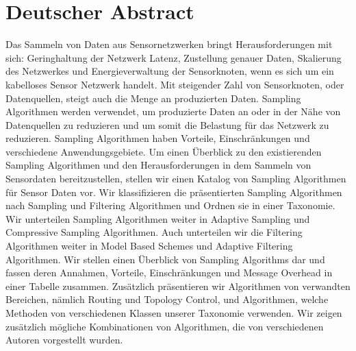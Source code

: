 \section*{Deutscher Abstract}
\begin{onehalfspace}
    Das Sammeln von Daten aus Sensornetzwerken bringt Herausforderungen mit
    sich: Geringhaltung der Netzwerk Latenz, Zustellung genauer Daten,
    Skalierung des Netzwerkes und Energieverwaltung der Sensorknoten, wenn es
    sich um ein kabelloses Sensor Netzwerk handelt. Mit steigender Zahl von
    Sensorknoten, oder Datenquellen, steigt auch die Menge an produzierten
    Daten. Sampling Algorithmen werden verwendet, um produzierte Daten an oder
    in der Nähe von Datenquellen zu reduzieren und um somit die Belastung für
    das Netzwerk zu reduzieren. Sampling Algorithmen haben Vorteile,
    Einschränkungen und verschiedene Anwendungsgebiete. Um einen Überblick zu
    den existierenden Sampling Algorithmen und den Herausforderungen in dem
    Sammeln von Sensordaten bereitzustellen, stellen wir einen Katalog von
    Sampling Algorithmen für Sensor Daten vor. Wir klassifizieren die
    präsentierten Sampling Algorithmen nach Sampling und Filtering Algorithmen
    und Ordnen sie in einer Taxonomie. Wir unterteilen Sampling Algorithmen
    weiter in Adaptive Sampling und Compressive Sampling Algorithmen. Auch
    unterteilen wir die Filtering Algorithmen weiter in Model Based Schemes und
    Adaptive Filtering Algorithmen. Wir stellen einen Überblick von Sampling
    Algorithms dar und fassen deren Annahmen, Vorteile, Einschränkungen und
    Message Overhead in einer Tabelle zusammen. Zusätzlich präsentieren wir
    Algorithmen von verwandten Bereichen, nämlich Routing und Topology Control,
    und Algorithmen, welche Methoden von verschiedenen Klassen unserer
    Taxonomie verwenden. Wir zeigen zusätzlich mögliche Kombinationen von
    Algorithmen, die von verschiedenen Autoren vorgestellt wurden.
\end{onehalfspace}
\clearpage


